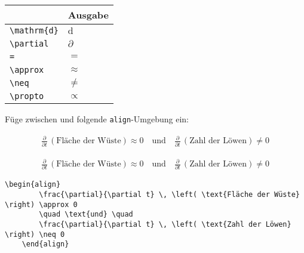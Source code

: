 \documentclass["WS\space 16-17\space -\space LaTeX-Kurs\space -\space Praesentation\space -\space 1.tex"]{subfiles}
\begin{document}
\begin{frame}[fragile]
	\begin{center}
		\begin{tabular}{ll}
			\toprule
			\color{math-cmd}{Mathe}\color{black}{-Befehl}							&	Ausgabe					\\ \midrule
			\lstinline|\mathrm{d}|		&	$\mathrm{d}$		\\
			\lstinline|\partial|		&	$\partial$		
			\\
			\lstinline|=|		&	$=$		
      \\
			\lstinline|\approx|		&	$\approx$		
			\\
			\lstinline|\neq|					&	$\neq$		\\
	        \lstinline|\propto|					&	$\propto$		\\
			\bottomrule
		\end{tabular}
	\end{center}
	\pause\btVFill
	\Aufgabee
		Füge zwischen  und  folgende \lstinline[basicstyle=\normalfont\normalsize]|align|-Umgebung ein:
	\begin{outputbox}
	    \begin{align}
		    \frac{\partial}{\partial t} \, \left( \text{Fläche der Wüste} \right) \approx 0
		    \quad \text{und} \quad
		      \frac{\partial}{\partial t} \, \left( \text{Zahl der Löwen} \right) \neq 0 \tag{7}
		\end{align}	
    \end{outputbox}
	\vspace{0.3cm}
\end{frame}
\begin{frame}[fragile]
	\Losung
	\begin{outputbox}
	    \begin{align}
	        \frac{\partial}{\partial t} \, \left( \text{Fläche der Wüste} \right) \approx 0
	        \quad \text{und} \quad
	        \frac{\partial}{\partial t} \, \left( \text{Zahl der Löwen} \right) \neq 0 \tag{7}
	    \end{align}
	\end{outputbox}

	\Code
	\begin{lstlisting}[gobble=4]
    \begin{align}
        \frac{\partial}{\partial t} \, \left( \text{Fläche der Wüste} \right) \approx 0
        \quad \text{und} \quad
        \frac{\partial}{\partial t} \, \left( \text{Zahl der Löwen} \right) \neq 0
    \end{align}
	\end{lstlisting}
\end{frame}
\end{document}
